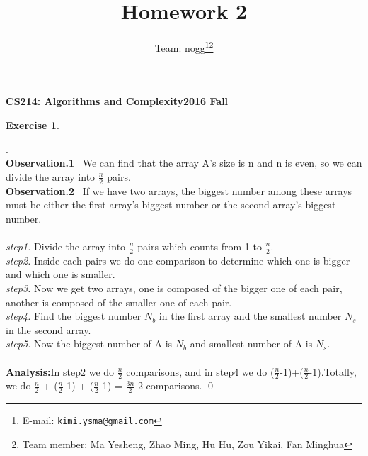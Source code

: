 \documentclass[12pt, notitlepage]{article}
\title{Homework 2}
\author{Team: nogg\footnote{E-mail: \texttt{kimi.ysma@gmail.com}}\footnote{Team member: Ma Yesheng, Zhao Ming, Hu Hu, Zou Yikai, Fan Minghua}}
\newtheorem{ex}{Exercise}
\newenvironment{sol}
  {\par\vspace{3mm}\noindent{\it Solution}.}{\qed}
\begin{document}
{\bf\small CS214: Algorithms and Complexity}\hfill{\bf\small 2016 Fall}
{\let\newpage\relax\maketitle}


\begin{ex}\end{ex}
\begin{sol}\\
	\textbf{Observation.1} ~We can find that the array A's size is n and n is even, so  we can divide the array into $\frac{n}{2}$ pairs.\\
	\textbf{Observation.2} ~If we have two arrays, the biggest number among these arrays must be either the first array's biggest number or the second array's biggest number.\\\\
	\emph{step1.} Divide the array into $\frac{n}{2}$ pairs which counts from 1 to $\frac{n}{2}$. \\
	\emph{step2.} Inside each pairs we do one comparison to determine which one is bigger and which one is smaller.\\
	\emph{step3.} Now we get two arrays, one is composed of the bigger one of each pair, another is composed of the smaller one of each pair.\\
	\emph{step4.} Find the biggest number $N_b$ in the first array and the smallest number $N_s$ in the second array.\\
	\emph{step5.} Now the biggest number of A is $N_b$ and smallest number of A is $N_s$. \\\\
	\textbf{Analysis:}In step2 we do $\frac{n}{2}$ comparisons, and in step4 we do ($\frac{n}{2}$-1)+($\frac{n}{2}$-1).Totally, we do $\frac{n}{2}$ + ($\frac{n}{2}$-1) + ($\frac{n}{2}$-1) = $\frac{3n}{2}$-2 comparisons.
\end{sol}
\end{document}
